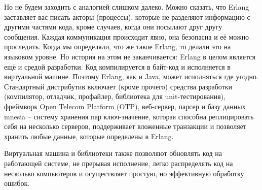 \documentclass[a4paper,12pt]{report}
\begin{document}
Но не будем заходить с аналогией слишком далеко. Можно сказать, что Erlang заставляет вас писать акторы (процессы), которые не разделяют информацию с другими частями кода, кроме случаев, когда они посылают друг другу сообщения. Каждая коммуникация происходит явно, она безопасна и её можно проследить.
Когда мы определяли, что же такое Erlang, то делали это на языковом уровне. Но история на этом не заканчивается: Erlang в целом является ещё и средой разработки. Код компилируется в байт\--код и исполняется в виртуальной машине. Поэтому Erlang, как и Java, может исполняться где угодно. Стандартный дистрибутив включает (кроме прочего) средства разработки (компилятор, отладчик, профайлер, библиотека для unit\--тестирования), фреймворк Open Telecom Platform (OTP), веб\--сервер, парсер и базу данных mnesia \--- систему хранения пар ключ\--значение, которая способна реплицировать себя на несколько серверов, поддерживает вложенные транзакции и позволяет хранить любые данные, которые определены в Erlang.

Виртуальная машина и библиотеки также позволяют обновлять код на работающей системе, не прерывая исполнение, легко распределять код на несколько компьютеров и осуществляет простую, но эффективную обработку ошибок.
\end{document}
